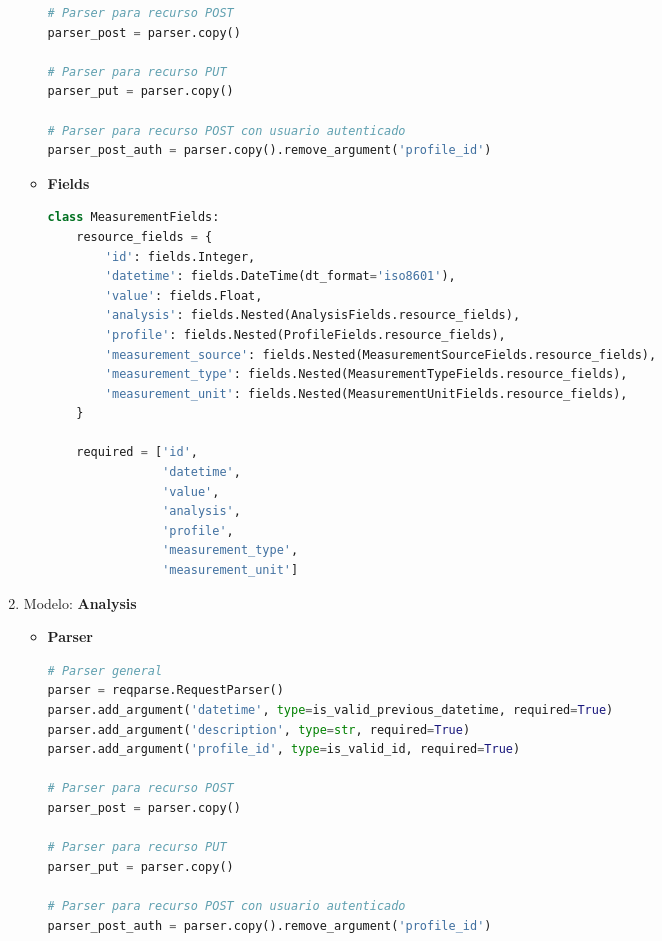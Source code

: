 \documentclass[a4paper,12pt]{article}
\begin{document}
\begin{enumerate}
\begin{itemize}
\begin{lstlisting}[language=Python]
# Parser para recurso POST
parser_post = parser.copy()

# Parser para recurso PUT
parser_put = parser.copy()

# Parser para recurso POST con usuario autenticado
parser_post_auth = parser.copy().remove_argument('profile_id')
\end{lstlisting}

	\item \textbf{Fields}
	
\begin{lstlisting}[language=Python]
class MeasurementFields:
    resource_fields = {
        'id': fields.Integer,
        'datetime': fields.DateTime(dt_format='iso8601'),
        'value': fields.Float,
        'analysis': fields.Nested(AnalysisFields.resource_fields),
        'profile': fields.Nested(ProfileFields.resource_fields),
        'measurement_source': fields.Nested(MeasurementSourceFields.resource_fields),
        'measurement_type': fields.Nested(MeasurementTypeFields.resource_fields),
        'measurement_unit': fields.Nested(MeasurementUnitFields.resource_fields),
    }

    required = ['id',
                'datetime',
                'value',
                'analysis',
                'profile',
                'measurement_type',
                'measurement_unit']
\end{lstlisting}

\end{itemize}

\item Modelo: \textbf{Analysis}

\begin{itemize}
	\item \textbf{Parser}
	
\begin{lstlisting}[language=Python]
# Parser general
parser = reqparse.RequestParser()
parser.add_argument('datetime', type=is_valid_previous_datetime, required=True)
parser.add_argument('description', type=str, required=True)
parser.add_argument('profile_id', type=is_valid_id, required=True)

# Parser para recurso POST
parser_post = parser.copy()

# Parser para recurso PUT
parser_put = parser.copy()

# Parser para recurso POST con usuario autenticado
parser_post_auth = parser.copy().remove_argument('profile_id')
\end{lstlisting}


\end{itemize}
\end{enumerate}
\end{document}

